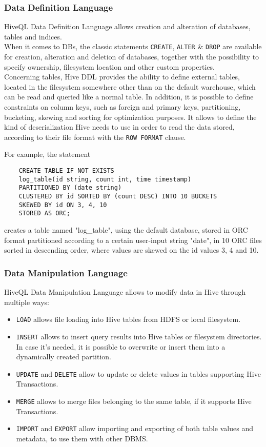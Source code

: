 \subsubsection{Data Definition Language}

HiveQL Data Definition Language allows creation and alteration of databases, tables and indices.\\When it comes to DBs, the classic statements \verb|CREATE|, \verb|ALTER| \& \verb|DROP| are available for creation, alteration and deletion of databases, together with the possibility to specify ownership, filesystem location and other custom properties.\\
Concerning tables, Hive DDL provides the ability to define external tables, located in the filesystem somewhere other than on the default warehouse, which can be read and queried like a normal table. In addition, it is possible to define constraints on column keys, such as foreign and primary keys, partitioning, bucketing, skewing and sorting for optimization purposes. It allows to define the kind of deserialization Hive needs to use in order to read the data stored, according to their file format with the \verb|ROW FORMAT| clause.

For example, the statement

\begin{verbatim}
    CREATE TABLE IF NOT EXISTS 
    log_table(id string, count int, time timestamp)
    PARTITIONED BY (date string)
    CLUSTERED BY id SORTED BY (count DESC) INTO 10 BUCKETS
    SKEWED BY id ON 3, 4, 10
    STORED AS ORC;
\end{verbatim}

creates a table named "log\_table", using the default database, stored in ORC format partitioned according to a certain user-input string "date", in 10 ORC files sorted in descending order, where values are skewed on the id values 3, 4 and 10.

\subsubsection{Data Manipulation Language}

HiveQL Data Manipulation Language allows to modify data in Hive through multiple ways:

\begin{itemize}
    \item \verb|LOAD| allows file loading into Hive tables from HDFS or local filesystem.  
    \item \verb|INSERT| allows to insert query results into Hive tables or filesystem directories. In case it's needed, it is possible to overwrite or insert them into a dynamically created partition. 
    \item \verb|UPDATE| and \verb|DELETE| allow to update or delete values in tables supporting Hive Transactions.
    \item \verb|MERGE| allows to merge files belonging to the same table, if it supports Hive Transactions.
    \item \verb|IMPORT| and \verb|EXPORT| allow importing and exporting of both table values and metadata, to use them with other DBMS.
\end{itemize}

